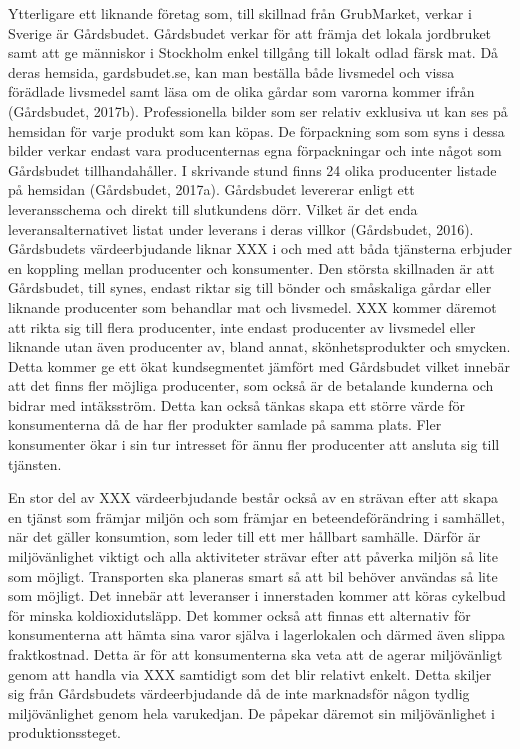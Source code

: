 \documentclass[10pt,a4paper,oneside]{article}
\begin{document}
Ytterligare ett liknande företag som, till skillnad från GrubMarket, verkar i Sverige är Gårdsbudet. Gårdsbudet verkar för att främja det lokala jordbruket samt att ge människor i Stockholm enkel tillgång till lokalt odlad färsk mat. Då deras hemsida, gardsbudet.se, kan man beställa både livsmedel och vissa förädlade livsmedel samt läsa om de olika gårdar som varorna kommer ifrån (Gårdsbudet, 2017b). Professionella bilder som ser relativ exklusiva ut kan ses på hemsidan för varje produkt som kan köpas. De förpackning som som syns i dessa bilder verkar endast vara producenternas egna förpackningar och inte något som Gårdsbudet tillhandahåller. I skrivande stund finns 24 olika producenter listade på hemsidan (Gårdsbudet, 2017a). Gårdsbudet levererar enligt ett leveransschema och direkt till slutkundens dörr. Vilket är det enda leveransalternativet listat under leverans i deras villkor (Gårdsbudet, 2016). Gårdsbudets värdeerbjudande liknar XXX i och med att båda tjänsterna erbjuder en koppling mellan producenter och konsumenter. Den största skillnaden är att Gårdsbudet, till synes, endast riktar sig till bönder och småskaliga gårdar eller liknande producenter som behandlar mat och livsmedel. XXX kommer däremot att rikta sig till flera producenter, inte endast producenter av livsmedel eller liknande utan även producenter av, bland annat,  skönhetsprodukter och smycken. Detta kommer ge ett ökat kundsegmentet jämfört med Gårdsbudet vilket innebär att det finns fler möjliga producenter, som också är de betalande kunderna och bidrar med intäksström. Detta kan också tänkas skapa ett större värde för konsumenterna då de har fler produkter samlade på samma plats. Fler konsumenter ökar i sin tur intresset för ännu fler producenter att ansluta sig till tjänsten. 

En stor del av XXX värdeerbjudande består också av en strävan efter att skapa en tjänst som främjar miljön och som främjar en beteendeförändring i samhället, när det gäller konsumtion,  som leder till ett mer hållbart samhälle. Därför är miljövänlighet viktigt och alla aktiviteter strävar efter att påverka miljön så lite som möjligt. Transporten ska planeras smart så att bil behöver användas så lite som möjligt. Det innebär att leveranser i innerstaden kommer att köras cykelbud för minska koldioxidutsläpp. Det kommer också att finnas ett alternativ för konsumenterna att hämta sina varor själva i lagerlokalen och därmed även slippa fraktkostnad. Detta är för att konsumenterna ska veta att de agerar miljövänligt genom att handla via XXX samtidigt som det blir relativt enkelt. Detta skiljer sig från Gårdsbudets värdeerbjudande då de inte marknadsför någon tydlig miljövänlighet genom hela varukedjan. De påpekar däremot sin miljövänlighet i produktionssteget. 
\end{document}
